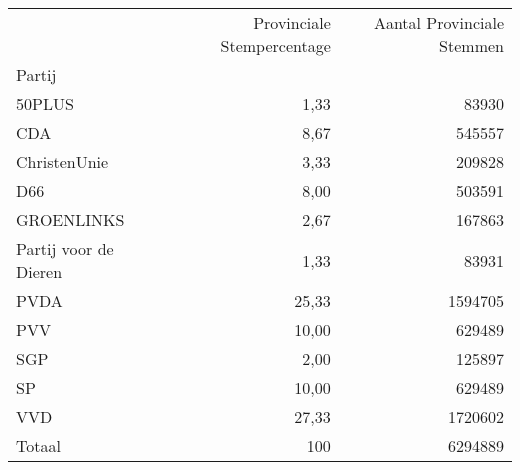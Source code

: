 \begin{tabular}{lrr}
\toprule
{} &  Provinciale Stempercentage &  Aantal Provinciale Stemmen \\
Partij                &                             &                             \\
\midrule
50PLUS                &                        1,33 &                       83930 \\
CDA                   &                        8,67 &                      545557 \\
ChristenUnie          &                        3,33 &                      209828 \\
D66                   &                        8,00 &                      503591 \\
GROENLINKS            &                        2,67 &                      167863 \\
Partij voor de Dieren &                        1,33 &                       83931 \\
PVDA                  &                       25,33 &                     1594705 \\
PVV                   &                       10,00 &                      629489 \\
SGP                   &                        2,00 &                      125897 \\
SP                    &                       10,00 &                      629489 \\
VVD                   &                       27,33 &                     1720602 \\
\midrule
Totaal			&								100	&						6294889		\\
\bottomrule
\end{tabular}
